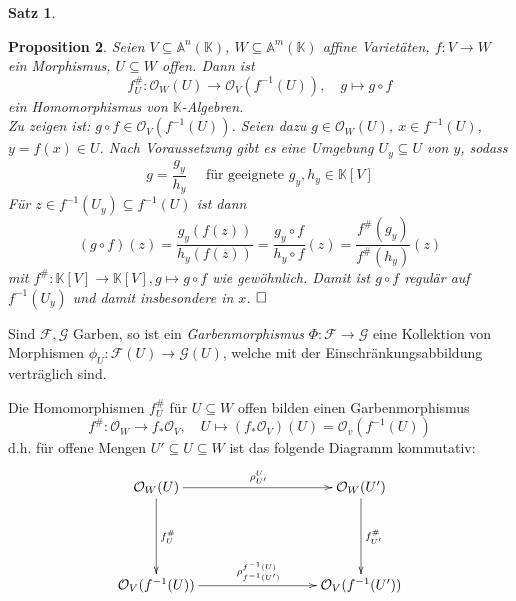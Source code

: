 \documentclass[11pt]{book}
\newtheorem{theorem}{Satz}[section]
\newtheorem{prop}[theorem]{Proposition}
\theoremstyle{nonumberbreak}
\newenvironment{pr}[1][]{\ifthenelse{\equal{#1}{}}{\proof}{\proof[#1]}\rm}{\endproof}
\newenvironment{bemdefin}[1][]{\ifthenelse{\equal{#1}{}}{\bemdefini}{\bemdefini[#1]}\rm}{\endbemdefini}
\begin{document}
\begin{spacing}{1.3}
\begin{theorem}
\begin{pr}
\begin{compactenum}
\end{compactenum}
\end{pr}

\end{theorem}

\begin{prop} %
Seien $V \subseteq \mathbb{A}^n(\mathbb{K})$, $W \subseteq \mathbb{A}^m(\mathbb{K})$ affine Varietäten, $f:V \longrightarrow W$ ein Morphismus, $U \subseteq W$ offen. Dann ist
$$f_U^\#: \mathcal{O}_W(U) \longrightarrow \mathcal{O}_V(f^{-1}(U)), \quad g \mapsto g \circ f$$
ein Homomorphismus von $\mathbb{K}$-Algebren.\\
\begin{pr}
Zu zeigen ist: $g \circ f \in \mathcal{O}_V(f^{-1}(U))$.
Seien dazu $g \in \mathcal{O}_W(U)$, $x \in f^{-1}(U)$, $y=f(x) \in U$. Nach Voraussetzung gibt es eine Umgebung $U_y\subseteq U$ von $y$, sodass
$$g = \frac{g_y}{h_y} \quad \textrm{ für geeignete } g_y, h_y \in \mathbb{K}[V]$$
Für $z \in f^{-1}(U_y) \subseteq f^{-1}(U)$ ist dann
$$(g \circ f )(z) = \frac{g_y(f(z))}{h_y(f(z))} = \frac{g_y \circ f }{h_y \circ f }(z) = \frac{f^\#(g_y) }{f ^\# (h_y)}(z)$$
mit $f^\#: \mathbb{K}[V] \longrightarrow \mathbb{K}[V], g \mapsto g \circ f$ wie gewöhnlich.
Damit ist $g \circ f $ regulär auf $f^{-1}(U_y)$ und damit insbesondere in $x$. $\hfill \Box$
\end{pr}
\end{prop}

\begin{bemdefin} %
\begin{compactenum}
\item Sind $\mathcal{F}, \mathcal{G}$ Garben, so ist ein \textit{Garbenmorphismus} $\Phi: \mathcal{F} \longrightarrow \mathcal{G}$ eine Kollektion von Morphismen $\phi_U: \mathcal{F}(U) \longrightarrow \mathcal{G}(U)$, welche mit der Einschränkungsabbildung verträglich sind.
\item Die Homomorphismen $f_U^\#$ für $U \subseteq W$ offen bilden einen Garbenmorphismus $$f^\#: \mathcal{O}_W \longrightarrow f_{*}\mathcal{O}_V, \quad U \mapsto (f_{*} \mathcal{O}_V)(U) = \mathcal{O}_v(f^{-1}(U))$$
d.h. für offene Mengen $U' \subseteq U \subseteq W$ ist das folgende Diagramm kommutativ:
$$
\begin{xy}
\xymatrix{
\mathcal{O}_W(U) \ar[rrr]^{\rho^{U}_{U'}} \ar[dd]^{f_U^\#} &&& \mathcal{O}_W(U') \ar[dd]^{f_{U'}^\#} \\
&&& \\
\mathcal{O}_V(f^{-1}(U)) \ar[rrr]^{\rho^{f^{-1}(U)}_{f^{-1}(U')}} &&& \mathcal{O}_V(f^{-1}(U'))
}
\end{xy}
$$
\end{compactenum}
\end{bemdefin}


\end{spacing}
\end{document}
